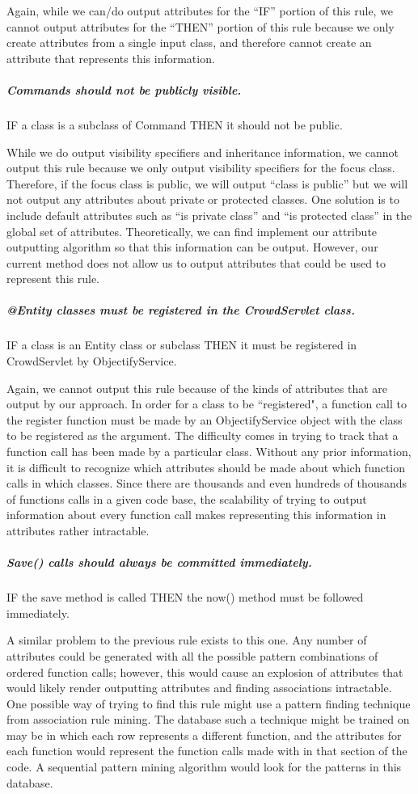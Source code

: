 \documentclass[12pt]{article}
\begin{document}
		Again, while we can/do output attributes for the “IF” portion of this rule, we cannot output attributes for the “THEN” portion of this rule because we only create attributes from a single input class, and therefore cannot create an attribute that represents this information.

		\subparagraph{Commands should not be publicly visible.} IF a class is a subclass of Command THEN it should not be public.
		
		While we do output visibility specifiers and inheritance information, we cannot output this rule because we only output visibility specifiers for the focus class. Therefore, if the focus class is public, we will output “class is public” but we will not output any attributes about private or protected classes. One solution is to include default attributes such as “is private class” and “is protected class” in the global set of attributes. Theoretically, we can find implement our attribute outputting algorithm so that this information can be output. However, our current method does not allow us to output attributes that could be used to represent this rule.
		
		\subparagraph{@Entity classes must be registered in the CrowdServlet class.} IF a class is an Entity class or subclass THEN it must be registered in CrowdServlet by ObjectifyService.
		
		Again, we cannot output this rule because of the kinds of attributes that are output by our approach. In order for a class to be ``registered", a function call to the register function must be made by an ObjectifyService object with the class to be registered as the argument. The difficulty comes in trying to track that a function call has been made by a particular class. Without any prior information, it is difficult to recognize which attributes should be made about which function calls in which classes. Since there are thousands and even hundreds of thousands of functions calls in a given code base, the scalability of trying to output information about every function call makes representing this information in attributes rather intractable. 

		
		\subparagraph{Save() calls should always be committed immediately.} IF the save method is called THEN the now() method must be followed immediately.
		
		A similar problem to the previous rule exists to this one. Any number of attributes could be generated with all the possible pattern combinations of ordered function calls; however, this would cause an explosion of attributes that would likely render outputting attributes and finding associations intractable. One possible way of trying to find this rule might use a pattern finding technique from association rule mining. The database such a technique might be trained on may be in which each row represents a different function, and the attributes for each function would represent the function calls made with in that section of the code. A sequential pattern mining algorithm would look for the patterns in this database.
		
\end{document}
